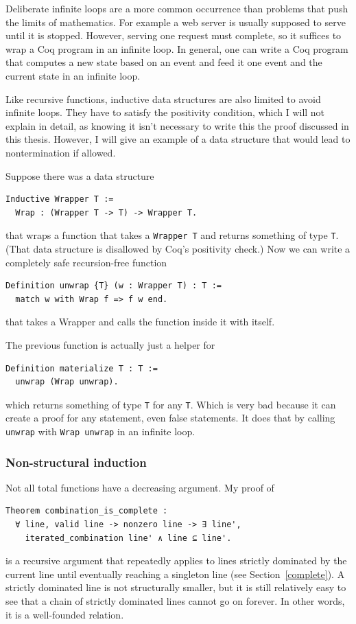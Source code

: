 \documentclass[english, 12pt, a4paper, sci, a-1b, online]{aaltothesis}
\newcommand\icoq[1]{\texttt{#1}}
\begin{document}
Deliberate infinite loops are a more common occurrence than problems that push the limits of mathematics. For example a web server is usually supposed to serve until it is stopped. However, serving one request must complete, so it suffices to wrap a Coq program in an infinite loop. In general, one can write a Coq program that computes a new state based on an event and feed it one event and the current state in an infinite loop.

Like recursive functions, inductive data structures are also limited to avoid infinite loops. They have to satisfy the positivity condition, which I will not explain in detail, as knowing it isn't necessary to write this the proof discussed in this thesis. However, I will give an example of a data structure that would lead to nontermination if allowed.

Suppose there was a data structure
\begin{verbatim}
Inductive Wrapper T :=
  Wrap : (Wrapper T -> T) -> Wrapper T.
\end{verbatim}
that wraps a function that takes a \icoq{Wrapper T} and returns something of type \icoq{T}. (That data structure is disallowed by Coq's positivity check.) Now we can write a completely safe recursion-free function
\begin{verbatim}
Definition unwrap {T} (w : Wrapper T) : T :=
  match w with Wrap f => f w end.
\end{verbatim}
that takes a Wrapper and calls the function inside it with itself.

The previous function is actually just a helper for
\begin{verbatim}
Definition materialize T : T :=
  unwrap (Wrap unwrap).
\end{verbatim}
which returns something of type \icoq{T} for any \icoq{T}. Which is very bad because it can create a proof for any statement, even false statements. It does that by calling \icoq{unwrap} with \icoq{Wrap unwrap} in an infinite loop.

\subsubsection{Non-structural induction}

Not all total functions have a decreasing argument. My proof of
\begin{verbatim}
Theorem combination_is_complete :
  ∀ line, valid line -> nonzero line -> ∃ line',
    iterated_combination line' ∧ line ⊆ line'.
\end{verbatim}
is a recursive argument that repeatedly applies to lines strictly dominated by the current line until eventually reaching a singleton line (see Section~\ref{complete}). A strictly dominated line is not structurally smaller, but it is still relatively easy to see that a chain of strictly dominated lines cannot go on forever. In other words, it is a well-founded relation.
\end{document}
